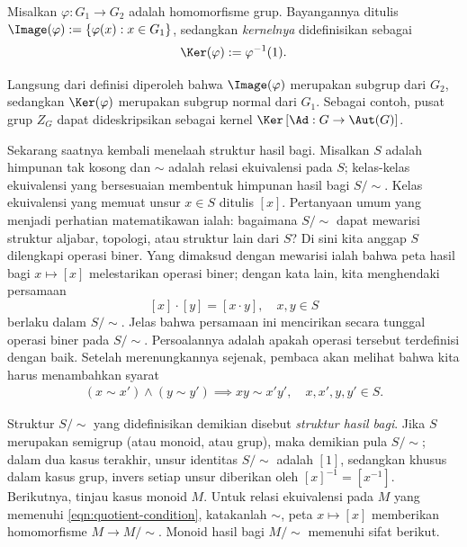 \begin{definition}
	Misalkan $\varphi: G_1 \to G_2$ adalah homomorfisme grup. Bayangannya ditulis $\Image(\varphi) := \{\varphi(x) : x \in G_1\}$, sedangkan \emph{kernelnya} didefinisikan sebagai 
	\[ \Ker(\varphi) := \varphi^{-1}(1). \]
\end{definition}
Langsung dari definisi diperoleh bahwa $\Image(\varphi)$ merupakan subgrup dari $G_2$, sedangkan $\Ker(\varphi)$ merupakan subgrup normal dari $G_1$. Sebagai contoh, pusat grup $Z_G$ dapat dideskripsikan sebagai kernel $\Ker\left[ \Ad: G \to \Aut(G) \right]$.

Sekarang saatnya kembali menelaah struktur hasil bagi. Misalkan $S$ adalah himpunan tak kosong dan $\sim$ adalah relasi ekuivalensi pada $S$; kelas-kelas ekuivalensi yang bersesuaian membentuk himpunan hasil bagi $S/\sim$. Kelas ekuivalensi yang memuat unsur $x \in S$ ditulis $[x]$. Pertanyaan umum yang menjadi perhatian matematikawan ialah: bagaimana $S/\sim$ dapat mewarisi struktur aljabar, topologi, atau struktur lain dari $S$? Di sini kita anggap $S$ dilengkapi operasi biner. Yang dimaksud dengan mewarisi ialah bahwa peta hasil bagi $x \mapsto [x]$ melestarikan operasi biner; dengan kata lain, kita menghendaki persamaan
\[ [x] \cdot [y] = [x \cdot y], \quad x,y \in S \]
berlaku dalam $S/\sim$. Jelas bahwa persamaan ini mencirikan secara tunggal operasi biner pada $S/\sim$. Persoalannya adalah apakah operasi tersebut terdefinisi dengan baik. Setelah merenungkannya sejenak, pembaca akan melihat bahwa kita harus menambahkan syarat
\begin{gather}\label{eqn:quotient-condition}
	(x \sim x') \wedge (y \sim y') \implies xy \sim x'y', \quad x,x',y,y' \in S.
\end{gather}

Struktur $S/\sim$ yang didefinisikan demikian disebut \emph{struktur hasil bagi}. Jika $S$ merupakan semigrup (atau monoid, atau grup), maka demikian pula $S/\sim$; dalam dua kasus terakhir, unsur identitas $S/\sim$ adalah $[1]$, sedangkan khusus dalam kasus grup, invers setiap unsur diberikan oleh $[x]^{-1} = [x^{-1}]$. Berikutnya, tinjau kasus monoid $M$. Untuk relasi ekuivalensi pada $M$ yang memenuhi \eqref{eqn:quotient-condition}, katakanlah $\sim$, peta $x \mapsto [x]$ memberikan homomorfisme $M \to M/\sim$. Monoid hasil bagi $M/\sim$ memenuhi sifat berikut.


